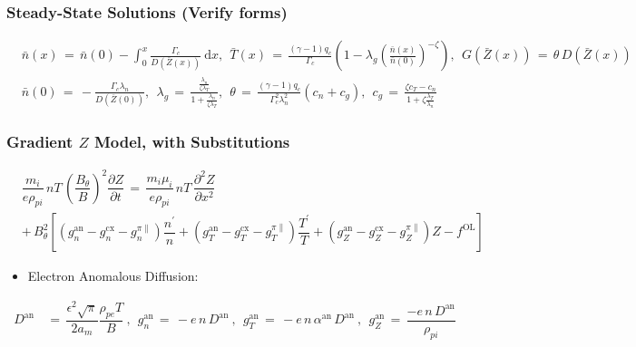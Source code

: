 \documentclass[a4paper,8pt]{article}
\providecommand{\tightlist}{%
  \setlength{\itemsep}{0pt}\setlength{\parskip}{0pt}}
\begin{document}
\hypertarget{steady-state-solutions-verify-forms}{%
\subsubsection{Steady-State Solutions (Verify
forms)}\label{steady-state-solutions-verify-forms}}

\small\begin{align}
    &\bar{n}(x) \,=\, \bar{n}(0) - \int_0^x \frac{\Gamma_c}{D(\bar{Z}(x))}~\text{d}x, ~~ \bar{T}(x) \,=\, \frac{(\gamma - 1) q_c}{\Gamma_c} \left(1 - \lambda_g\left(\frac{\bar{n}(x)}{\bar{n}(0)}\right)^{-\zeta}\right), ~~ G(\bar{Z}(x)) \,=\, \theta\,D(\bar{Z}(x)) \\
    &\bar{n}(0) \,=\, -\frac{\Gamma_c \lambda_n}{D(\bar{Z}(0))}, ~~ \lambda_g \,=\, \frac{\frac{\lambda_n}{\zeta \lambda_T}}{1 + \frac{\lambda_n}{\zeta \lambda_T}}, ~~ \theta \,=\, \frac{(\gamma - 1) q_c}{\Gamma_c^2 \lambda_n^2} (c_n + c_g), ~~ c_g \,=\, \frac{\zeta c_T - c_n}{1 + \zeta \frac{\lambda_T}{\lambda_n}}
\end{align}\normalsize

\hypertarget{gradient-z-model-with-substitutions}{%
\subsubsection{\texorpdfstring{Gradient \(Z\) Model, with
Substitutions}{Gradient Z Model, with Substitutions}}\label{gradient-z-model-with-substitutions}}

\small\begin{align}
    &\dfrac{m_i}{e \rho_{pi}} \,n T\, \left(\dfrac{B_\theta}{B}\right)^2 \dfrac{\partial Z}{\partial t} \,=\, \dfrac{m_i \mu_i}{e \rho_{pi}} \,n T\, \dfrac{\partial^2 Z}{\partial x^2} \\
    &+\, B_\theta^2 \left[\left(g_n^\text{an} - g_n^\text{cx} - g_n^{\pi\parallel}\right) \dfrac{n^\prime}{n} + \left(g_T^\text{an} - g_T^\text{cx} - g_T^{\pi\parallel}\right) \dfrac{T^\prime}{T} + \left(g_Z^\text{an} - g_Z^\text{cx} - g_Z^{\pi\parallel}\right) Z - f^\text{OL}\right]
\end{align}\normalsize

\begin{itemize}
\tightlist
\item
  Electron Anomalous Diffusion:
\end{itemize}

\begin{align}
    D^\text{an} \,&=\, \dfrac{\epsilon^2 \sqrt{\pi}}{2 a_m} \dfrac{\rho_{pe} T}{B}~,~~ g_n^\text{an} \,=\, -e \,n\, D^\text{an}~,~~ g_T^\text{an} \,=\, -e \,n\, \alpha^\text{an}\, D^\text{an}~,~~ g_Z^\text{an} \,=\, \dfrac{-e \,n\, D^\text{an}}{\rho_{pi}}
\end{align}
\end{document}
